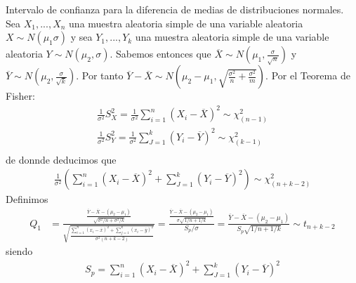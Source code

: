 \begin{ejemplo}
Intervalo de confianza para la diferencia de medias de distribuciones normales.
Sea $X_1,...,X_n$ una muestra aleatoria simple de una variable aleatoria $X \sim N(\mu_1\sigma)$ y sea $Y_1,...,Y_k$ una muestra aleatoria simple de una variable aleatoria $Y \sim N(\mu_2,\sigma)$. Sabemos entonces que $\overline{X} \sim N\left(\mu_1,\frac{\sigma}{\sqrt{n}} \right)$ y $\overline{Y} \sim N\left(\mu_2,\frac{\sigma}{\sqrt{k}} \right)$. Por tanto $\overline{Y} - \overline{X} \sim N\left(\mu_2 - \mu_1,\sqrt{\frac{\sigma^2}{n} + \frac{\sigma^2}{m}} \right)$. Por el Teorema de Fisher:
\begin{align*}
    \frac{1}{\sigma^2}S^2_X = \frac{1}{\sigma^2} \sum_{i=1}^{n} (X_i - \overline{X})^2 \sim \chi_{(n-1)}^2 \\
    \frac{1}{\sigma^2}S^2_Y = \frac{1}{\sigma^2} \sum_{J=1}^{k} (Y_i - \overline{Y})^2 \sim \chi_{(k-1)}^2 \\

\end{align*}
de donnde deducimos que 
\begin{align*}
    \frac{1}{\sigma^2} \left(\sum_{i=1}^{n} (X_i - \overline{X})^2 +  \sum_{J=1}^{k} (Y_i - \overline{Y})^2\right) \sim \chi_{(n+k-2)}^2 
\end{align*}
Definimos
\begin{align*}
    Q_1 &= \frac{\frac{\overline{Y} - \overline{X} - (\mu_2 - \mu_1)}{\sqrt{\sigma^2/n + \sigma^2/k}}}{\sqrt{\frac{\sum_{i=1}^{n} (x_i - \overline{x})^2 + \sum_{j=1}^{k} (x_i - \overline{y})^2}{\sigma^2(n+k-2)}}} = \frac{\frac{\overline{Y} - \overline{X} - (\mu_2 -\mu_1)}{\sigma\sqrt{1/n + 1/k}}}{S_p/\sigma} = \frac{\overline{Y} - \overline{X} - (\mu_2 -\mu_1)}{S_p\sqrt{1/n + 1/k}} \sim t_{n+k-2}
\end{align*}
siendo 
\begin{align*}
    S_p = \sum_{i=1}^{n} (X_i - \overline{X})^2 +  \sum_{J=1}^{k} (Y_i - \overline{Y})^2
\end{align*}
\end{ejemplo}

